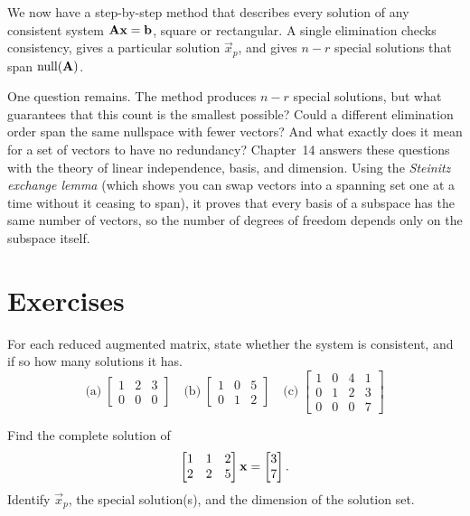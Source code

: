 \begin{connectionbox}
We now have a step-by-step method that describes every solution of any consistent
system $\mathbf{A}\mathbf{x}=\mathbf{b}$, square or rectangular. A single elimination checks
consistency, gives a particular solution $\vec{x}_p$, and gives $n-r$ special solutions
that span $\operatorname{null}(\mathbf{A})$.

One question remains. The method produces $n-r$ special solutions, but what guarantees
that this count is the smallest possible? Could a different elimination order span the
same nullspace with fewer vectors? And what exactly does it mean for a set of vectors to
have no redundancy? Chapter~14 answers these questions with the theory of linear
independence, basis, and dimension. Using the \emph{Steinitz exchange lemma} (which shows
you can swap vectors into a spanning set one at a time without it ceasing to span), it
proves that every basis of a subspace has the same number of vectors, so the number of
degrees of freedom depends only on the subspace itself.
\end{connectionbox}

\section{Exercises}

\begin{exercise}
\label{ch13:ex-verdict}
For each reduced augmented matrix, state whether the system is consistent, and if so how
many solutions it has.
\[
\text{(a)}\;\left[\begin{array}{cc|c}1&2&3\\0&0&0\end{array}\right]\quad
\text{(b)}\;\left[\begin{array}{cc|c}1&0&5\\0&1&2\end{array}\right]\quad
\text{(c)}\;\left[\begin{array}{ccc|c}1&0&4&1\\0&1&2&3\\0&0&0&7\end{array}\right]
\]
\end{exercise}

\begin{exercise}
\label{ch13:ex-pns}
Find the complete solution of
\[
  \begin{bmatrix}1&1&2\\2&2&5\end{bmatrix}\mathbf{x}=\begin{bmatrix}3\\7\end{bmatrix}.
\] Identify $\vec{x}_p$, the
special solution(s), and the dimension of the solution set.
\end{exercise}

